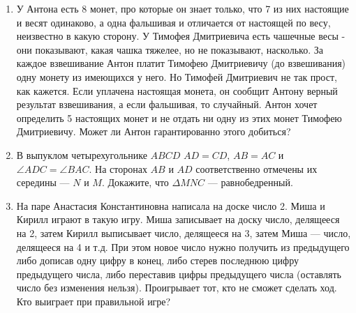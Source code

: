 \documentclass{article}
\begin{document}
\begin{enumerate}[label*=\arabic{enumi}.]
        \item У Антона есть 8 монет, про которые он знает только, что 7 из них настоящие и весят одинаково, а одна фальшивая и отличается от настоящей по весу, неизвестно в какую сторону.
        У Тимофея Дмитриевича есть чашечные весы - они показывают, какая чашка тяжелее, но не показывают, насколько.
        За каждое взвешивание Антон платит Тимофею Дмитриевичу (до взвешивания) одну монету из имеющихся у него.
        Но Тимофей Дмитриевич не так прост, как кажется.
        Если уплачена настоящая монета, он сообщит Антону верный результат взвешивания, а если фальшивая, то случайный.
        Антон хочет определить 5 настоящих монет и не отдать ни одну из этих монет Тимофею Дмитриевичу.
        Может ли Антон гарантированно этого добиться?

        \item В выпуклом четырехугольнике $ABCD$ $AD = CD$,  $AB = AC$ и $ \angle ADC = \angle BAC$.
        На сторонах $AB$ и $AD$ соответственно отмечены их середины --- $N$ и $M$.
        Докажите, что $\Delta MNC$ --- равнобедренный.

        \item На паре Анастасия Константиновна написала на доске число 2.
        Миша и Кирилл играют в такую игру.
        Миша записывает на доску число, делящееся на 2, затем Кирилл выписывает число, делящееся на 3, затем Миша --- число, делящееся на 4 и т.д. При этом новое число нужно получить из предыдущего либо дописав одну цифру в конец, либо стерев последнюю цифру предыдущего числа, либо переставив цифры предыдущего числа (оставлять число без изменения нельзя).
        Проигрывает тот, кто не сможет сделать ход.
        Кто выиграет при правильной игре?

    \end{enumerate}
\end{document}
